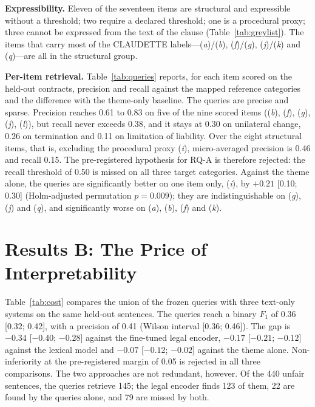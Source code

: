 \documentclass{IOS-Book-Article}
\newcommand{\corpus}{CLAUDETTE}
\newcommand{\gi}[1]{(\textit{#1})}
\begin{document}
\textbf{Expressibility.} Eleven of the seventeen items are structural and expressible without a threshold; two require a declared threshold; one is a procedural proxy; three cannot be expressed from the text of the clause (Table~\ref{tab:greylist}). The items that carry most of the \corpus{} labels---\gi{a}/\gi{b}, \gi{f}/\gi{g}, \gi{j}/\gi{k} and \gi{q}---are all in the structural group.

\textbf{Per-item retrieval.} Table~\ref{tab:queries} reports, for each item scored on the held-out contracts, precision and recall against the mapped reference categories and the difference with the theme-only baseline. The queries are precise and sparse. Precision reaches 0.61 to 0.83 on five of the nine scored items (\gi{b}, \gi{f}, \gi{g}, \gi{j}, \gi{l}), but recall never exceeds 0.38, and it stays at 0.30 on unilateral change, 0.26 on termination and 0.11 on limitation of liability. Over the eight structural items, that is, excluding the procedural proxy \gi{i}, micro-averaged precision is 0.46 and recall 0.15. The pre-registered hypothesis for RQ-A is therefore rejected: the recall threshold of 0.50 is missed on all three target categories. Against the theme alone, the queries are significantly better on one item only, \gi{i}, by $+0.21$ [0.10; 0.30] (Holm-adjusted permutation $p = 0.009$); they are indistinguishable on \gi{g}, \gi{j} and \gi{q}, and significantly worse on \gi{a}, \gi{b}, \gi{f} and \gi{k}.



\section{Results B: The Price of Interpretability}
\label{sec:cost}
Table~\ref{tab:cost} compares the union of the frozen queries with three text-only systems on the same held-out sentences. The queries reach a binary $F_1$ of 0.36 [0.32; 0.42], with a precision of 0.41 (Wilson interval [0.36; 0.46]). The gap is $-0.34$ [$-0.40$; $-0.28$] against the fine-tuned legal encoder, $-0.17$ [$-0.21$; $-0.12$] against the lexical model and $-0.07$ [$-0.12$; $-0.02$] against the theme alone. Non-inferiority at the pre-registered margin of 0.05 is rejected in all three comparisons. The two approaches are not redundant, however. Of the 440 unfair sentences, the queries retrieve 145; the legal encoder finds 123 of them, 22 are found by the queries alone, and 79 are missed by both.


\end{document}
